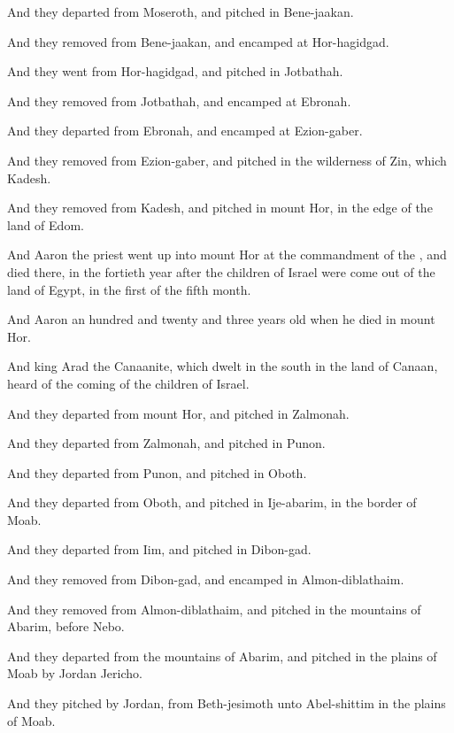 {And they
departed from
Moseroth, and
pitched in
Bene-jaakan.

And they
removed from
Bene-jaakan, and
encamped at
Hor-hagidgad.

And they
went from
Hor-hagidgad, and
pitched in
Jotbathah.

And they
removed from
Jotbathah, and
encamped at
Ebronah.

And they
departed from
Ebronah, and
encamped at
Ezion-gaber.

And they
removed from
Ezion-gaber, and
pitched in the
wilderness of
Zin, which
{}
Kadesh.

And they
removed from
Kadesh, and
pitched in
mount
Hor, in the
edge of the
land of
Edom.

And
Aaron the
priest went
up into
mount
Hor at the
commandment of the
{}, and
died there, in the
fortieth
year after the
children of
Israel were come
out of the
land of
Egypt, in the
first
{} of the
fifth
month.

And
Aaron
{} an
hundred and
twenty and
three
years
old when he
died in
mount
Hor.

And
king
Arad the
Canaanite, which
dwelt in the
south in the
land of
Canaan,
heard of the
coming of the
children of
Israel.

And they
departed from
mount
Hor, and
pitched in
Zalmonah.

And they
departed from
Zalmonah, and
pitched in
Punon.

And they
departed from
Punon, and
pitched in
Oboth.

And they
departed from
Oboth, and
pitched in
Ije-abarim, in the
border of
Moab.

And they
departed from
Iim, and
pitched in
Dibon-gad.

And they
removed from
Dibon-gad, and
encamped in
Almon-diblathaim.

And they
removed from
Almon-diblathaim, and
pitched in the
mountains of
Abarim,
before
Nebo.

And they
departed from the
mountains of
Abarim, and
pitched in the
plains of
Moab by
Jordan
{}
Jericho.

And they
pitched by
Jordan, from
Beth-jesimoth
{} unto
Abel-shittim in the
plains of
Moab.


}
